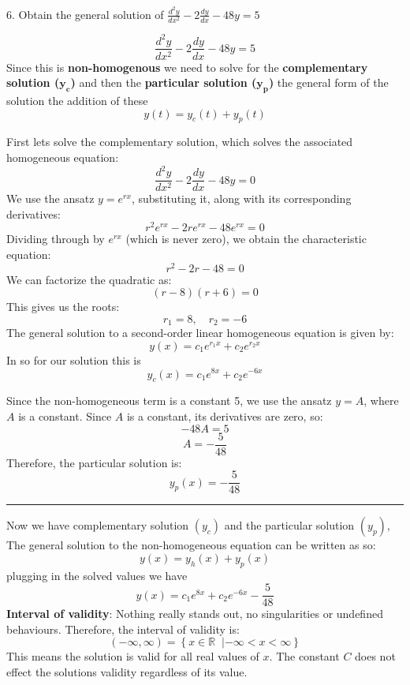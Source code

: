 \documentclass[a4paper, 12pt]{report}
\def\ni{green!60!black!40!white}
\begin{document}
    \newpage
    
    \begin{tcolorbox}[title={\color{black}\section{Q6}}, colback=white, colframe=\ni, boxrule=1mm, width=1\textwidth]
        6. Obtain the general solution of \( \frac{d^2 y}{dx^2} - 2 \frac{dy}{dx} - 48y = 5 \)
    \end{tcolorbox}
        \[ \frac{d^2 y}{dx^2} - 2 \frac{dy}{dx} - 48y = 5 \]
        Since this is \textbf{non-homogenous} we need to solve for the \textbf{complementary solution (\(\bm{y_c}\))} and then the \textbf{particular solution ($\bm{y_p}$)} the general form of the solution the addition of these $$y(t)=y_c(t)+y_p(t)$$
    \begin{minipage}[t]{0.5\textwidth}
            First lets solve the complementary solution, which solves the associated homogeneous equation:
            \[ \frac{d^2 y}{dx^2} - 2 \frac{dy}{dx} - 48y = 0 \]
            We use the ansatz \( y = e^{rx} \), substituting it, along with its corresponding derivatives:
            \[ r^2 e^{rx} - 2r e^{rx} - 48 e^{rx} = 0 \]
            Dividing through by \( e^{rx} \) (which is never zero), we obtain the characteristic equation:
            \[ r^2 - 2r - 48 = 0 \]
            We can factorize the quadratic as:
            \[(r - 8)(r + 6)=0\]
            This gives us the roots:
            \[ r_1 = 8, \quad r_2 = -6 \]
            The general solution to a second-order linear homogeneous equation is given by:
            \[ y(x) = c_1 e^{r_1x} + c_2 e^{r_2x} \]
            In so for our solution this is
            \[ y_c(x) = c_1 e^{8x} + c_2 e^{-6x} \]
    \end{minipage}\hfil%
    \begin{minipage}[t]{0.45\textwidth}
        Since the non-homogeneous term is a constant 5, we use the ansatz \(y=A\), where \(A\) is a constant. Since \(A\) is a constant, its derivatives are zero, so:
        \[-48A = 5\]
        \[A=-\frac{5}{48} \]
        Therefore, the particular solution is:
        \[ y_p(x) = -\frac{5}{48} \]

        \hrule
        \vspace{1em}
        
        Now we have complementary solution \((y_c)\) and the particular solution \((y_p)\), The general solution to the non-homogeneous equation can be written as so:
        \[ y(x) = y_h(x) + y_p(x) \]
        plugging in the solved values we have
        \[\boxed{y(x) = c_1 e^{8x} + c_2 e^{-6x} - \frac{5}{48}} \]    
        \textbf{Interval of validity}: Nothing really stands out, no singularities or undefined behaviours. Therefore, the interval of validity is:
        \[(-\infty, \infty) = \left\{x \in \mathbb{R} \;\; | -\infty < x < \infty\right\}\]
        This means the solution is valid for all real values of \(x\). The constant \(C\) does not effect the solutions validity regardless of its value.
    \end{minipage}        
    
\end{document}

